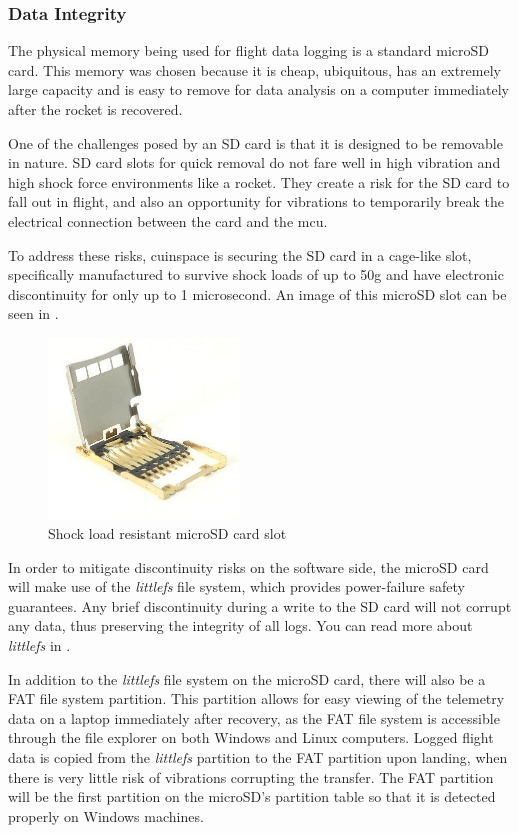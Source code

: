 \subsubsection{Data Integrity}

The physical memory being used for flight data logging is a standard microSD card. This memory was chosen because it is cheap, ubiquitous, has an extremely large capacity and is easy to remove for data analysis on a computer immediately after the rocket is recovered.

One of the challenges posed by an SD card is that it is designed to be removable in nature. SD card slots for quick removal do not fare well in high vibration and high shock force environments like a rocket. They create a risk for the SD card to fall out in flight, and also an opportunity for vibrations to temporarily break the electrical connection between the card and the \gls{mcu}.

To address these risks, \gls{cuinspace} is securing the SD card in a cage-like slot, specifically manufactured to survive shock loads of up to 50g and have electronic discontinuity for only up to 1 microsecond. An image of this microSD slot can be seen in .

\begin{figure}[H]
    \centering
    \includegraphics[width=2in]{./assets/images/sd-card-cage.jpg}
    \caption{Shock load resistant microSD card slot \cite{sd-card-cage}}
    \label{fig:sd-card-cage}
\end{figure}

In order to mitigate discontinuity risks on the software side, the microSD card will make use of the \textit{littlefs} file system, which provides power-failure safety guarantees. Any brief discontinuity during a write to the SD card will not corrupt any data, thus preserving the integrity of all logs. You can read more about \textit{littlefs} in .

In addition to the \textit{littlefs} file system on the microSD card, there will also be a FAT file system partition. This partition allows for easy viewing of the telemetry data on a laptop immediately after recovery, as the FAT file system is accessible through the file explorer on both Windows and Linux computers. Logged flight data is copied from the \textit{littlefs} partition to the FAT partition upon landing, when there is very little risk of vibrations corrupting the transfer. The FAT partition will be the first partition on the microSD's partition table so that it is detected properly on Windows machines.

